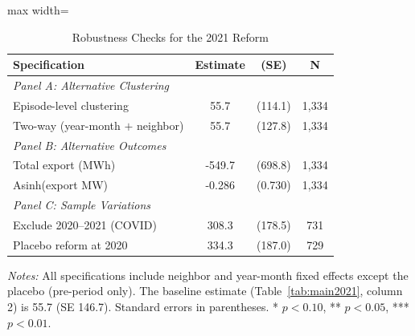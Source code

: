 \begin{table}[H]
\centering
\caption{Robustness Checks for the 2021 Reform}
\begin{threeparttable}
\begin{adjustbox}{max width=\textwidth}
\begin{tabular}{lccc}
\toprule
Specification & Estimate & (SE) & N \\
\midrule
\textit{Panel A: Alternative Clustering} & & & \\
\quad Episode-level clustering & 55.7 & (114.1) & 1,334 \\
\quad Two-way (year-month $+$ neighbor) & 55.7 & (127.8) & 1,334 \\
\midrule
\textit{Panel B: Alternative Outcomes} & & & \\
\quad Total export (MWh) & -549.7 & (698.8) & 1,334 \\
\quad Asinh(export MW) & -0.286 & (0.730) & 1,334 \\
\midrule
\textit{Panel C: Sample Variations} & & & \\
\quad Exclude 2020--2021 (COVID) & 308.3 & (178.5) & 731 \\
\quad Placebo reform at 2020 & 334.3 & (187.0) & 729 \\
\bottomrule
\end{tabular}
\end{adjustbox}
\begin{tablenotes}[flushleft]
\small
\item \textit{Notes:} All specifications include neighbor and year-month fixed effects except the placebo (pre-period only). The baseline estimate (Table~\ref{tab:main2021}, column 2) is 55.7 (SE 146.7). Standard errors in parentheses. * $p<0.10$, ** $p<0.05$, *** $p<0.01$.
\end{tablenotes}
\end{threeparttable}
\label{tab:robust}
\end{table}

